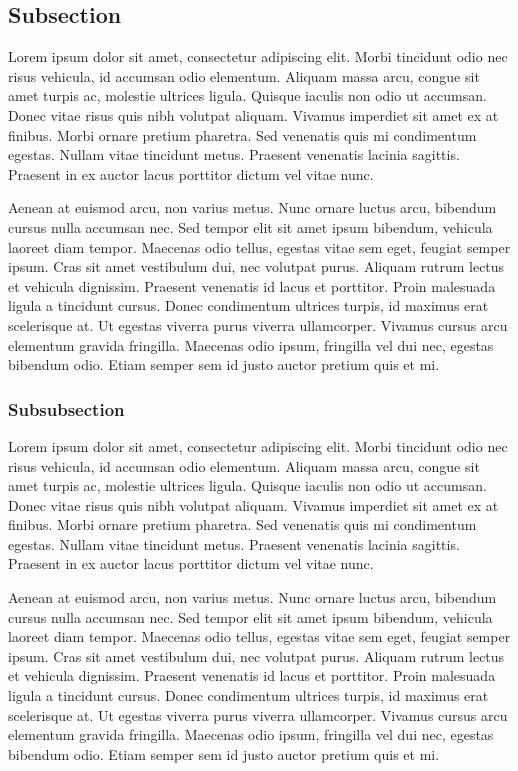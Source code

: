 \documentclass[onecolumn]{miniclass}
\begin{document}
\subsection{Subsection}
Lorem ipsum dolor sit amet, consectetur adipiscing elit. Morbi tincidunt odio nec risus vehicula, id accumsan odio elementum. Aliquam massa arcu, congue sit amet turpis ac, molestie ultrices ligula. Quisque iaculis non odio ut accumsan. Donec vitae risus quis nibh volutpat aliquam. Vivamus imperdiet sit amet ex at finibus. Morbi ornare pretium pharetra. Sed venenatis quis mi condimentum egestas. Nullam vitae tincidunt metus. Praesent venenatis lacinia sagittis. Praesent in ex auctor lacus porttitor dictum vel vitae nunc.

Aenean at euismod arcu, non varius metus. Nunc ornare luctus arcu, bibendum cursus nulla accumsan nec. Sed tempor elit sit amet ipsum bibendum, vehicula laoreet diam tempor. Maecenas odio tellus, egestas vitae sem eget, feugiat semper ipsum. Cras sit amet vestibulum dui, nec volutpat purus. Aliquam rutrum lectus et vehicula dignissim. Praesent venenatis id lacus et porttitor. Proin malesuada ligula a tincidunt cursus. Donec condimentum ultrices turpis, id maximus erat scelerisque at. Ut egestas viverra purus viverra ullamcorper. Vivamus cursus arcu elementum gravida fringilla. Maecenas odio ipsum, fringilla vel dui nec, egestas bibendum odio. Etiam semper sem id justo auctor pretium quis et mi.

\subsubsection{Subsubsection}
Lorem ipsum dolor sit amet, consectetur adipiscing elit. Morbi tincidunt odio nec risus vehicula, id accumsan odio elementum. Aliquam massa arcu, congue sit amet turpis ac, molestie ultrices ligula. Quisque iaculis non odio ut accumsan. Donec vitae risus quis nibh volutpat aliquam. Vivamus imperdiet sit amet ex at finibus. Morbi ornare pretium pharetra. Sed venenatis quis mi condimentum egestas. Nullam vitae tincidunt metus. Praesent venenatis lacinia sagittis. Praesent in ex auctor lacus porttitor dictum vel vitae nunc.

Aenean at euismod arcu, non varius metus. Nunc ornare luctus arcu, bibendum cursus nulla accumsan nec. Sed tempor elit sit amet ipsum bibendum, vehicula laoreet diam tempor. Maecenas odio tellus, egestas vitae sem eget, feugiat semper ipsum. Cras sit amet vestibulum dui, nec volutpat purus. Aliquam rutrum lectus et vehicula dignissim. Praesent venenatis id lacus et porttitor. Proin malesuada ligula a tincidunt cursus. Donec condimentum ultrices turpis, id maximus erat scelerisque at. Ut egestas viverra purus viverra ullamcorper. Vivamus cursus arcu elementum gravida fringilla. Maecenas odio ipsum, fringilla vel dui nec, egestas bibendum odio. Etiam semper sem id justo auctor pretium quis et mi.
\end{document}

